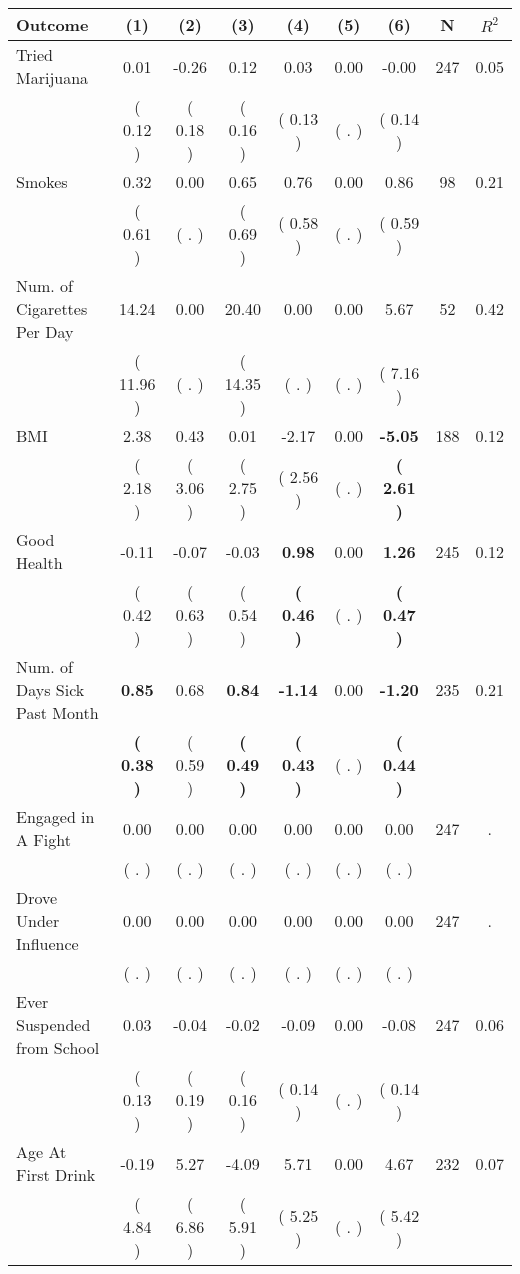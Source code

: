 \begin{tabular}{lcccccccc}
\toprule
 \textbf{Outcome} & \textbf{(1)} & \textbf{(2)} & \textbf{(3)} & \textbf{(4)} & \textbf{(5)} & \textbf{(6)} & \textbf{N} & \textbf{$ R^2$} \\
\midrule
Tried Marijuana &      0.01 &     -0.26 &      0.12 &      0.03 &      0.00 &     -0.00 & 247 &       0.05 \\ 
 & (     0.12 ) & (     0.18 ) & (     0.16 ) & (     0.13 ) & (        . ) & (     0.14 ) & \\
Smokes &      0.32 &      0.00 &      0.65 &      0.76 &      0.00 &      0.86 & 98 &       0.21 \\ 
 & (     0.61 ) & (        . ) & (     0.69 ) & (     0.58 ) & (        . ) & (     0.59 ) & \\
Num. of Cigarettes Per Day &     14.24 &      0.00 &     20.40 &      0.00 &      0.00 &      5.67 & 52 &       0.42 \\ 
 & (    11.96 ) & (        . ) & (    14.35 ) & (        . ) & (        . ) & (     7.16 ) & \\
BMI &      2.38 &      0.43 &      0.01 &     -2.17 &      0.00 & \textbf{    -5.05} & 188 &       0.12 \\ 
 & (     2.18 ) & (     3.06 ) & (     2.75 ) & (     2.56 ) & (        . ) & \textbf{(     2.61 )} & \\
Good Health &     -0.11 &     -0.07 &     -0.03 & \textbf{     0.98} &      0.00 & \textbf{     1.26} & 245 &       0.12 \\ 
 & (     0.42 ) & (     0.63 ) & (     0.54 ) & \textbf{(     0.46 )} & (        . ) & \textbf{(     0.47 )} & \\
Num. of Days Sick Past Month & \textbf{     0.85} &      0.68 & \textbf{     0.84} & \textbf{    -1.14} &      0.00 & \textbf{    -1.20} & 235 &       0.21 \\ 
 & \textbf{(     0.38 )} & (     0.59 ) & \textbf{(     0.49 )} & \textbf{(     0.43 )} & (        . ) & \textbf{(     0.44 )} & \\
Engaged in A Fight &      0.00 &      0.00 &      0.00 &      0.00 &      0.00 &      0.00 & 247 &          . \\ 
 & (        . ) & (        . ) & (        . ) & (        . ) & (        . ) & (        . ) & \\
Drove Under Influence &      0.00 &      0.00 &      0.00 &      0.00 &      0.00 &      0.00 & 247 &          . \\ 
 & (        . ) & (        . ) & (        . ) & (        . ) & (        . ) & (        . ) & \\
Ever Suspended from School &      0.03 &     -0.04 &     -0.02 &     -0.09 &      0.00 &     -0.08 & 247 &       0.06 \\ 
 & (     0.13 ) & (     0.19 ) & (     0.16 ) & (     0.14 ) & (        . ) & (     0.14 ) & \\
Age At First Drink &     -0.19 &      5.27 &     -4.09 &      5.71 &      0.00 &      4.67 & 232 &       0.07 \\ 
 & (     4.84 ) & (     6.86 ) & (     5.91 ) & (     5.25 ) & (        . ) & (     5.42 ) & \\
\bottomrule
\end{tabular}
